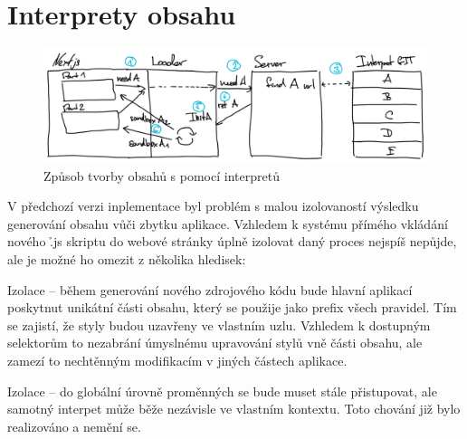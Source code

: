 


\section{Interprety obsahu}\label{sec:client-interpret}



\begin{figure}[htbp]
   \centering
   \includegraphics[max width=\textwidth]{assets/draft-interpreters}
   \caption{Způsob tvorby obsahů s pomocí interpretů}\label{fig:client-interpreter}
\end{figure}


V předchozí verzi inplementace byl problém s malou izolovaností výsledku generování obsahu vůči zbytku aplikace.
Vzhledem k systému přímého vkládání nového \h{.js} skriptu do webové stránky úplně izolovat daný proces nejspíš nepůjde, ale je možné ho omezit z několika hledisek:


\begin{dl}
   \item [Izolace \g{CSS}] – během generování nového zdrojového kódu bude hlavní aplikací poskytnut unikátní  části obsahu, který se použije jako prefix všech  pravidel.
   Tím se zajistí, že styly budou uzavřeny ve vlastním  uzlu.
   Vzhledem k dostupným  selektorům to nezabrání úmyslnému upravování stylů vně části obsahu, ale zamezí to nechtěnným modifikacím v jiných částech aplikace.
   \item [Izolace \g{JS}] – do globální úrovně proměnných se bude muset stále přistupovat, ale samotný interpet může běže nezávisle ve vlastním kontextu.
   Toto chování již bylo realizováno a nemění se.
\end{dl}
